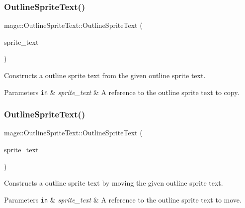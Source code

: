 \subsubsection{\texorpdfstring{Outline\+Sprite\+Text()}{OutlineSpriteText()}\hspace{0.1cm}{\footnotesize\ttfamily [3/4]}}
{\footnotesize\ttfamily mage\+::\+Outline\+Sprite\+Text\+::\+Outline\+Sprite\+Text (\begin{DoxyParamCaption}\item[{const \hyperlink{classmage_1_1_outline_sprite_text}{Outline\+Sprite\+Text} \&}]{sprite\+\_\+text }\end{DoxyParamCaption})\hspace{0.3cm}{\ttfamily [default]}}

Constructs a outline sprite text from the given outline sprite text.


\begin{DoxyParams}[1]{Parameters}
\mbox{\tt in}  & {\em sprite\+\_\+text} & A reference to the outline sprite text to copy. \\
\hline
\end{DoxyParams}
\hypertarget{classmage_1_1_outline_sprite_text_a86bb6e1637bcc71a4272f193466669e2}{}\label{classmage_1_1_outline_sprite_text_a86bb6e1637bcc71a4272f193466669e2} 
\subsubsection{\texorpdfstring{Outline\+Sprite\+Text()}{OutlineSpriteText()}\hspace{0.1cm}{\footnotesize\ttfamily [4/4]}}
{\footnotesize\ttfamily mage\+::\+Outline\+Sprite\+Text\+::\+Outline\+Sprite\+Text (\begin{DoxyParamCaption}\item[{\hyperlink{classmage_1_1_outline_sprite_text}{Outline\+Sprite\+Text} \&\&}]{sprite\+\_\+text }\end{DoxyParamCaption})\hspace{0.3cm}{\ttfamily [default]}}

Constructs a outline sprite text by moving the given outline sprite text.


\begin{DoxyParams}[1]{Parameters}
\mbox{\tt in}  & {\em sprite\+\_\+text} & A reference to the outline sprite text to move. \\
\hline
\end{DoxyParams}
\hypertarget{classmage_1_1_outline_sprite_text_ae4d77ebb3f5bac4fd02b148d6173d10f}{}\label{classmage_1_1_outline_sprite_text_ae4d77ebb3f5bac4fd02b148d6173d10f} 
